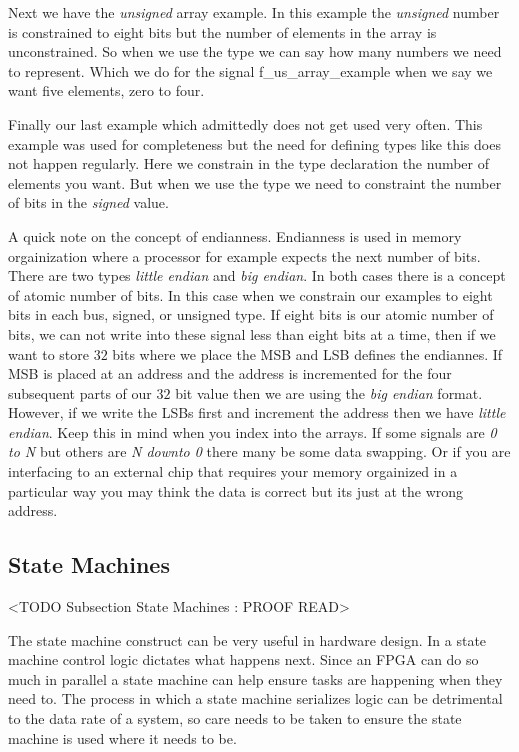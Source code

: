 Next we have the \emph{unsigned} array example. In this example the \emph{unsigned} number is constrained to eight bits but the number of elements in the array is unconstrained. So when we use the type we can say how many numbers we need to represent. Which we do for the signal f\_us\_array\_example when we say we want five elements, zero to four. 

Finally our last example which admittedly does not get used very often. This example was used for completeness but the need for defining types like this does not happen regularly. Here we constrain in the type declaration the number of elements you want. But when we use the type we need to constraint the number of bits in the \emph{signed} value. 

A quick note on the concept of endianness. Endianness is used in memory orgainization where a processor for example expects the next number of bits. There are two types \emph{little endian} and \emph{big endian}. In both cases there is a concept of atomic number of bits. In this case when we constrain our examples to eight bits in each bus, signed, or unsigned type. If eight bits is our atomic number of bits, we can not write into these signal less than eight bits at a time, then if we want to store $32$ bits where we place the \ac{MSB} and \ac{LSB} defines the endiannes. If \ac{MSB} is placed at an address and the address is incremented for the four subsequent parts of our $32$ bit value then we are using the \emph{big endian} format. However, if we write the \ac{LSB}s first and increment the address then we have \emph{little endian}. Keep this in mind when you index into the arrays. If some signals are \emph{0 to N} but others are \emph{N downto 0} there many be some data swapping. Or if you are interfacing to an external chip that requires your memory orgainized in a particular way you may think the data is correct but its just at the wrong address.  
	

\subsection{State Machines}
	<TODO Subsection State Machines : PROOF READ>

The state machine construct can be very useful in hardware design. In a state machine control logic dictates what happens next. Since an \ac{FPGA} can do so much in parallel a state machine can help ensure tasks are happening when they need to. The process in which a state machine serializes logic can be detrimental to the data rate of a system, so care needs to be taken to ensure the state machine is used where it needs to be. 

